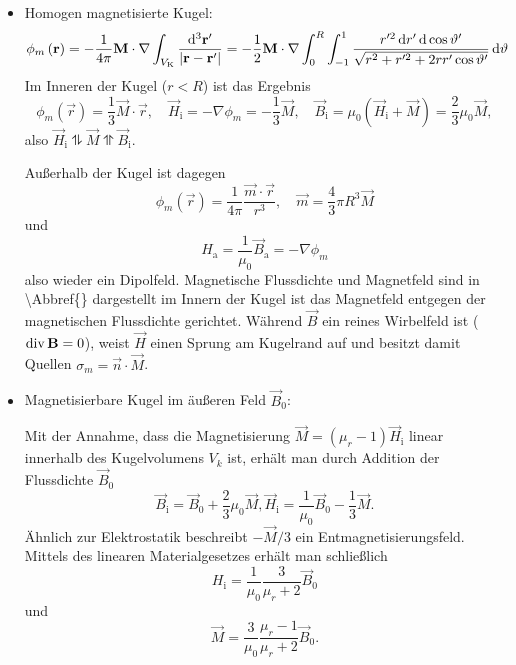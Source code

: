 \begin{itemize}
	\item Homogen magnetisierte Kugel:
	      \begin{equation*}
		      \phi _{m}\left(\mathbf{r}\right)=-\frac{1}{4\pi }\mathbf{M}\cdot \nabla \int _{V_{\mathrm{K}}}\frac{\mathop{}\!\mathrm{d} ^{3}\mathbf{r}'}{\left| \mathbf{r}-\mathbf{r}'\right| }=-\frac{1}{2}\mathbf{M}\cdot \nabla \int _{0}^{R}\int _{-1}^{1}\frac{r'^{2}\mathop{}\!\mathrm{d} r'\mathop{}\!\mathrm{d} \cos \vartheta '}{\sqrt{r^{2}+r'^{2}+2rr'\cos \vartheta '}}\mathop{}\!\mathrm{d} \vartheta
	      \end{equation*}
	      Im Inneren der Kugel ($r<R$) ist das Ergebnis
	      \begin{equation*}
		      \phi _{m}\left(\vec {r}\right)=\frac{1}{3}\vec {M}\cdot \vec {r}, \quad\vec {H}_{\mathrm{i}}=-\nabla \phi _{m}=-\frac{1}{3}\vec {M},\quad \vec {B}_{\mathrm{i}}=\mu _{0}\left(\vec {H}_{\mathrm{i}}+\vec {M}\right)=\frac{2}{3}\mu _{0}\vec {M},
	      \end{equation*}
	      also $\vec {H}_{\mathrm{i}}\updownharpoons \vec {M}\upupharpoons \vec {B}_{\mathrm{i}}$.

	      Außerhalb der Kugel ist dagegen
	      \begin{equation*}
		      \phi _{m}\left(\vec {r}\right)=\frac{1}{4\pi }\frac{\vec {m}\cdot \vec {r}}{r^{3}},\quad \vec {m}=\frac{4}{3}\pi R^{3}\vec {M}
	      \end{equation*}
	      und
	      \begin{equation*}
		      H_{\mathrm{a}}=\frac{1}{\mu _{0}}\vec {B}_{\mathrm{a}}=-\nabla \phi _{m}
	      \end{equation*}
	      also wieder ein Dipolfeld. Magnetische Flussdichte und Magnetfeld sind in \textbackslash Abbref\{\} dargestellt \textendash{} im Innern der Kugel ist das Magnetfeld entgegen der magnetischen Flussdichte gerichtet. Während $\vec {B}$ ein reines Wirbelfeld ist ($\operatorname{div} \mathbf{B}=0$), weist $\vec {H}$ einen Sprung am Kugelrand auf und besitzt damit Quellen $\sigma _{m}=\vec {n}\cdot \vec {M}$.

	\item Magnetisierbare Kugel im äußeren Feld $\vec {B}_{0}$:

	      Mit der Annahme, dass die Magnetisierung $\vec {M}=\left(\mu _{r}-1\right)\vec {H}_{\mathrm{i}}$ linear innerhalb des Kugelvolumens $V_{k}$ ist, erhält man durch Addition der Flussdichte $\vec {B}_{0}$
	      \begin{equation*}
		      \vec {B}_{\mathrm{i}}=\vec {B}_{0}+\frac{2}{3}\mu _{0}\vec {M}, \vec {H}_{\mathrm{i}}=\frac{1}{\mu _{0}}\vec {B}_{0}-\frac{1}{3}\vec {M}.
	      \end{equation*}
	      Ähnlich zur Elektrostatik beschreibt $-\vec {M}/3$ ein Entmagnetisierungsfeld. Mittels des linearen Materialgesetzes erhält man schließlich
	      \begin{equation*}
		      H_{\mathrm{i}}=\frac{1}{\mu _{0}}\frac{3}{\mu _{r}+2}\vec {B}_{0}
	      \end{equation*}
	      und
	      \begin{equation*}
		      \vec {M}=\frac{3}{\mu _{0}}\frac{\mu _{r}-1}{\mu _{r}+2}\vec {B}_{0}.
	      \end{equation*}
\end{itemize}

